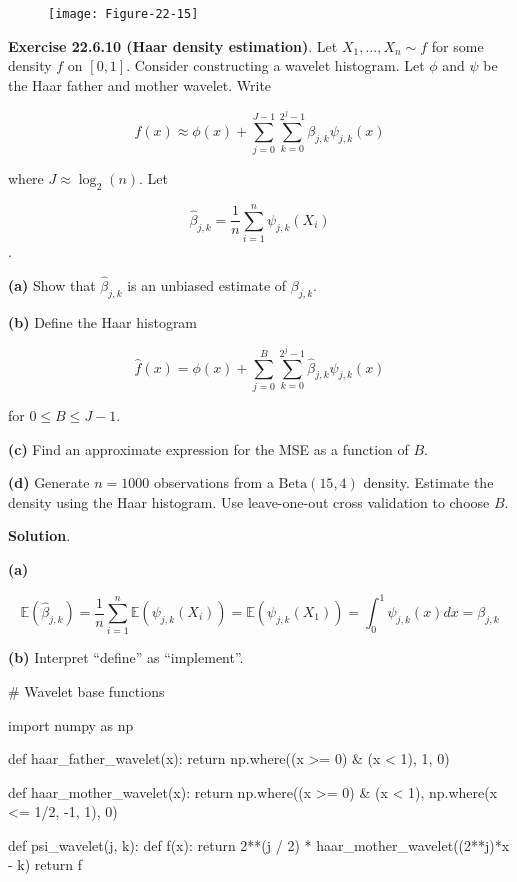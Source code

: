 \begin{figure}[H]
\centering
\texttt{[image: Figure-22-15]}
\end{figure}

\textbf{Exercise 22.6.10 (Haar density estimation)}. Let
\(X_{1}, \dots, X_{n} \sim f\) for some density \(f\) on \([0, 1]\).
Consider constructing a wavelet histogram. Let \(\phi\) and \(\psi\) be
the Haar father and mother wavelet. Write

\[ f(x) \approx \phi(x) + \sum_{j=0}^{J - 1} \sum_{k=0}^{2^{j} - 1} \beta_{j, k} \psi_{j, k}(x) \]

where \(J \approx \log_{2}(n)\). Let

\[ \hat{\beta}_{j, k} = \frac{1}{n} \sum_{i=1}^{n} \psi_{j, k}(X_{i}) \].

\textbf{(a)} Show that \(\hat{\beta}_{j, k}\) is an unbiased estimate of
\(\beta_{j, k}\).

\textbf{(b)} Define the Haar histogram

\[ \hat{f}(x) = \phi(x) + \sum_{j=0}^{B} \sum_{k=0}^{2^{j} - 1} \hat{\beta}_{j, k} \psi_{j, k}(x) \]

for \(0 \leq B \leq J - 1\).

\textbf{(c)} Find an approximate expression for the MSE as a function of
\(B\).

\textbf{(d)} Generate \(n = 1000\) observations from a
\(\text{Beta}(15, 4)\) density. Estimate the density using the Haar
histogram. Use leave-one-out cross validation to choose \(B\).

\textbf{Solution}.

\textbf{(a)}

\[ \mathbb{E}(\hat{\beta}_{j, k}) = \frac{1}{n} \sum_{i=1}^{n} \mathbb{E}(\psi_{j, k}(X_{i}))
= \mathbb{E}(\psi_{j, k}(X_{1})) = \int_{0}^{1} \psi_{j, k}(x) dx = \beta_{j, k} \]

\textbf{(b)} Interpret ``define'' as ``implement''.

\begin{python}
# Wavelet base functions

import numpy as np

def haar_father_wavelet(x):
    return np.where((x >= 0) & (x < 1), 1, 0)

def haar_mother_wavelet(x):
    return np.where((x >= 0) & (x < 1),  np.where(x <= 1/2, -1, 1), 0)

def psi_wavelet(j, k):
    def f(x):
        return 2**(j / 2) * haar_mother_wavelet((2**j)*x - k)
    return f
\end{python}

